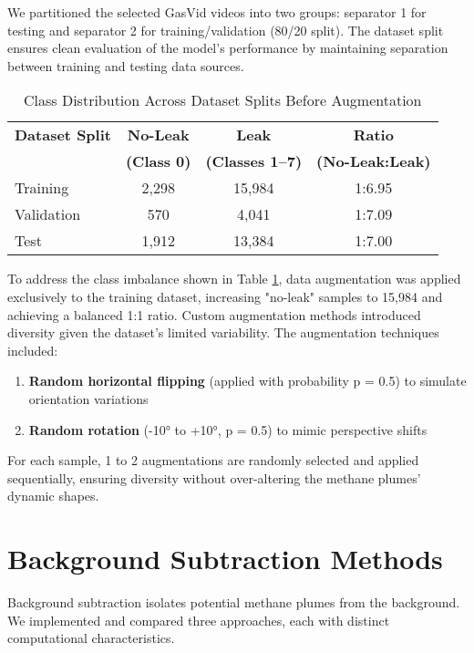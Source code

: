 We partitioned the selected GasVid videos into two groups: separator 1 for testing and separator 2 for training/validation (80/20 split). The dataset split ensures clean evaluation of the model's performance by maintaining separation between training and testing data sources.

\begin{table}[htbp]
\caption{Class Distribution Across Dataset Splits Before Augmentation}
\label{tab:class_distribution}
\begin{tabular}{|l|c|c|c|}
\hline
\textbf{Dataset Split} & \textbf{No-Leak} & \textbf{Leak} & \textbf{Ratio} \\
& \textbf{(Class 0)} & \textbf{(Classes 1–7)} & \textbf{(No-Leak:Leak)} \\
\hline
Training & 2,298 & 15,984 & 1:6.95 \\
Validation & 570 & 4,041 & 1:7.09 \\
Test & 1,912 & 13,384 & 1:7.00 \\
\hline
\end{tabular}
\end{table}

To address the class imbalance shown in Table \ref{tab:class_distribution}, data augmentation was applied exclusively to the training dataset, increasing "no-leak" samples to 15,984 and achieving a balanced 1:1 ratio. Custom augmentation methods introduced diversity given the dataset's limited variability. The augmentation techniques included:

\begin{enumerate}
\item \textbf{Random horizontal flipping} (applied with probability p = 0.5) to simulate orientation variations
\item \textbf{Random rotation} (-10° to +10°, p = 0.5) to mimic perspective shifts
\end{enumerate}

For each sample, 1 to 2 augmentations are randomly selected and applied sequentially, ensuring diversity without over-altering the methane plumes' dynamic shapes.

\section{Background Subtraction Methods}

Background subtraction isolates potential methane plumes from the background. We implemented and compared three approaches, each with distinct computational characteristics.

